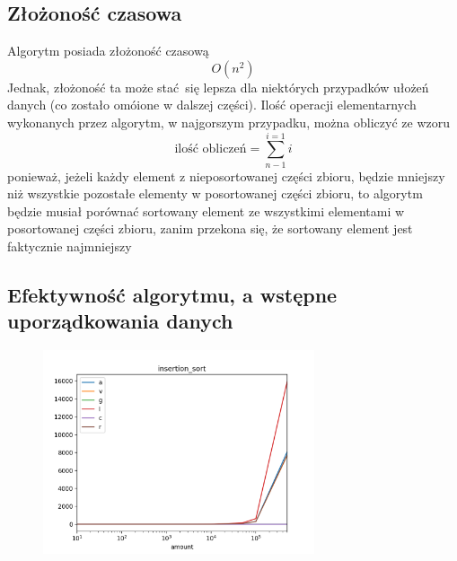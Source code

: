 \documentclass[]{article}
\begin{document}
	\subsection{Złożoność czasowa}
		Algorytm posiada złożoność czasową
		\[
		O(n^2)
		\]
		Jednak, złożoność ta może stać się lepsza dla niektórych przypadków ułożeń danych (co zostało omóione w dalszej części). Ilość operacji elementarnych wykonanych przez algorytm, w najgorszym przypadku, można obliczyć ze wzoru
		\[
		\text{ilość obliczeń} = \sum_{n - 1}^{i = 1}i
		\]
		ponieważ, jeżeli każdy element z nieposortowanej części zbioru, będzie mniejszy niż wszystkie pozostałe elementy w posortowanej części zbioru, to algorytm będzie musiał porównać sortowany element ze wszystkimi elementami w posortowanej części zbioru, zanim przekona się, że sortowany element jest faktycznie najmniejszy
	\subsection{Efektywność algorytmu, a wstępne uporządkowania danych}
		\begin{figure}[H]
			\centering
			\includegraphics[width=8cm]{insertion_sort_gather.png}	
		\end{figure}
\end{document}
